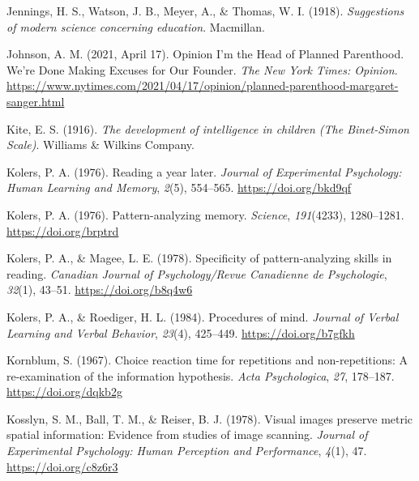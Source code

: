 \documentclass[
  oneside,
  12pt]{crumpbook}
\newlength{\cslhangindent}
\newlength{\cslentryspacingunit} %
\newenvironment{CSLReferences}[2] %
 {%
  \setlength{\parindent}{0pt}
  \ifodd #1
  \let\oldpar\par
  \def\par{\hangindent=\cslhangindent\oldpar}
  \fi
  \setlength{\parskip}{#2\cslentryspacingunit}
 }%
 {}
\begin{document}
\begin{CSLReferences}{1}{0}
\leavevmode{}%
Jennings, H. S., Watson, J. B., Meyer, A., \& Thomas, W. I. (1918). \emph{Suggestions of modern science concerning education}. {Macmillan}.

\leavevmode{}%
Johnson, A. M. (2021, April 17). Opinion \textbar{} {I}'m the {Head} of {Planned Parenthood}. {We}'re {Done Making Excuses} for {Our Founder}. \emph{The New York Times: Opinion}. \url{https://www.nytimes.com/2021/04/17/opinion/planned-parenthood-margaret-sanger.html}

\leavevmode{}%
Kite, E. S. (1916). \emph{The development of intelligence in children ({The Binet}-{Simon Scale})}. {Williams \& Wilkins Company}.

\leavevmode{}%
Kolers, P. A. (1976). Reading a year later. \emph{Journal of Experimental Psychology: Human Learning and Memory}, \emph{2}(5), 554--565. \url{https://doi.org/bkd9qf}

\leavevmode{}%
Kolers, P. A. (1976). Pattern-analyzing memory. \emph{Science}, \emph{191}(4233), 1280--1281. \url{https://doi.org/brptrd}

\leavevmode{}%
Kolers, P. A., \& Magee, L. E. (1978). Specificity of pattern-analyzing skills in reading. \emph{Canadian Journal of Psychology/Revue Canadienne de Psychologie}, \emph{32}(1), 43--51. \url{https://doi.org/b8q4w6}

\leavevmode{}%
Kolers, P. A., \& Roediger, H. L. (1984). Procedures of mind. \emph{Journal of Verbal Learning and Verbal Behavior}, \emph{23}(4), 425--449. \url{https://doi.org/b7gfkh}

\leavevmode{}%
Kornblum, S. (1967). Choice reaction time for repetitions and non-repetitions: {A} re-examination of the information hypothesis. \emph{Acta Psychologica}, \emph{27}, 178--187. \url{https://doi.org/dqkb2g}

\leavevmode{}%
Kosslyn, S. M., Ball, T. M., \& Reiser, B. J. (1978). Visual images preserve metric spatial information: Evidence from studies of image scanning. \emph{Journal of Experimental Psychology: Human Perception and Performance}, \emph{4}(1), 47. \url{https://doi.org/c8z6r3}


\end{CSLReferences}
\end{document}
